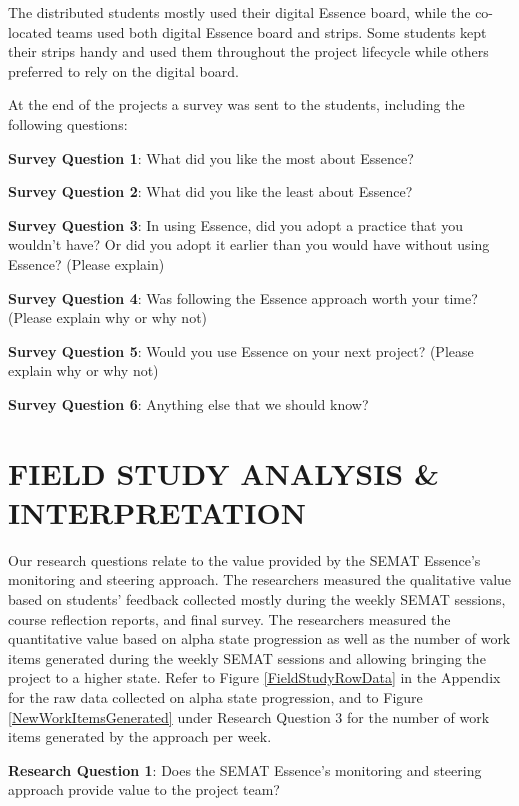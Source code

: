 
The distributed students mostly used their digital Essence board, while the co-located teams used both digital Essence board and strips. Some students kept their strips handy and used them throughout the project lifecycle while others preferred to rely on the digital board.

At the end of the projects a survey was sent to the students, including the following questions:

\textbf{Survey Question 1}: What did you like the most about Essence? 

\textbf{Survey Question 2}: What did you like the least about Essence? 

\textbf{Survey Question 3}: In using Essence, did you adopt a practice that you wouldn't have? Or did you adopt it earlier than you would have without using Essence? (Please explain)

\textbf{Survey Question 4}: Was following the Essence approach worth your time? (Please explain why or why not)

\textbf{Survey Question 5}: Would you use Essence on your next project? (Please explain why or why not)

\textbf{Survey Question 6}: Anything else that we should know?

\section{FIELD STUDY ANALYSIS \& INTERPRETATION}
Our research questions relate to the value provided by the SEMAT Essence's monitoring and steering approach. The researchers measured the qualitative value based on students' feedback collected mostly during the weekly SEMAT sessions, course reflection reports, and final survey. The researchers measured the quantitative value based on alpha state progression as well as the number of work items generated during the weekly SEMAT sessions and allowing bringing the project to a higher state. Refer to Figure \ref{FieldStudyRowData} in the Appendix for the raw data collected on alpha state progression, and to Figure \ref{NewWorkItemsGenerated} under Research Question 3 for the number of work items generated by the approach per week.

\textbf{Research Question 1}: Does the SEMAT Essence's monitoring and steering approach provide value to the project team?

